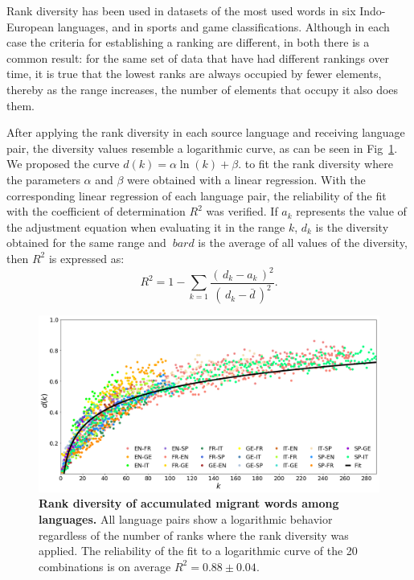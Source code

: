 \documentclass[10pt,letterpaper]{article} %
\begin{document}
Rank diversity has been used in datasets of the most used words in six Indo-European languages, and in sports and game classifications. Although in each case the criteria for establishing a ranking are different, in both there is a common result: for the same set of data that have had different rankings over time, it is true that the lowest ranks are always occupied by fewer elements, thereby as the range increases, the number of elements that occupy it also does them.

After applying the rank diversity in each source language and receiving language pair, the diversity values resemble a logarithmic curve, as can be seen in Fig~\ref{fig.DR_art}. We proposed the curve $d(k) =  \alpha \ln(k) + \beta.$ to fit the rank diversity where the parameters $\alpha$ and $\beta$ were obtained with a linear regression. With the corresponding linear regression of each language pair, the reliability of the fit with the coefficient of determination $R^{2}$ was verified. If $ a_ {k} $ represents the value of the adjustment equation when evaluating it in the range $ k $, $ d_ {k} $ is the diversity obtained for the same range and $ \ bar {d} $ is the average of all values ​​of the diversity, then $R^{2}$ is expressed as:
\begin{equation}
R^{2} = 1 - \sum_{k = 1} \frac{ \left( \,d_{k} - a_{k} \,\right)^{2}  }{ \left( \, d_{k} - \bar{d} \,\right)^{2} }.	
\label{ec.r2_diversidad}
\end{equation}

\begin{figure}[!h]
	\begin{adjustwidth}{-2.5cm}{1cm}
		\centering
		\includegraphics[scale=.38]{DR_art.png}
		\caption{{\bf Rank diversity of accumulated migrant words among languages.} All language pairs show a logarithmic behavior regardless of the number of ranks where the rank diversity was applied. The reliability of the fit to a logarithmic curve of the 20 combinations is on average $R^{2}= 0.88 \pm 0.04$.}
		\label{fig.DR_art}
	\end{adjustwidth}
\end{figure}
\end{document}
